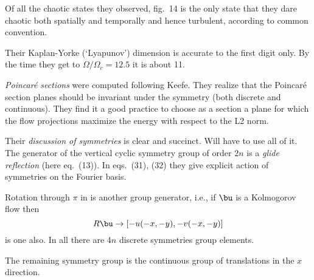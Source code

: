 \begin{description}
\begin{description}
{Of all the chaotic states they observed, fig.~14 is the only state that
they dare
chaotic both spatially and temporally and hence
turbulent, according to common convention.



Their Kaplan-Yorke (`Lyapunov') dimension is accurate to the first digit only.
By the time they get to $\Omega/\Omega_c=12.5$ it is about 11.

\emph{Poincar\'e sections} were computed following Keefe. They
realize that the Poincar\'e section planes should be invariant under the
symmetry (both discrete and continuous). They find it a good practice to
choose as a section a plane for which the flow projections maximize the
energy with respect to the L2 norm.

Their \emph{discussion of symmetries} is clear and succinct. Will have
to use all of it.
The generator
of the vertical cyclic symmetry group of order $2n$ is a \emph{glide reflection}
(here eq.~(13)). In eqs.~(31), (32)
they give explicit action of symmetries on the Fourier basis.

Rotation through $\pi$ in is another group
generator, i.e., if $\bu$ is a Kolmogorov flow then
\[
R \bu \to [-u(-x,-y),-v(-x,-y)]
\]
is one also. In all there are $4n$ discrete symmetries group elements.

The remaining symmetry group is the continuous group of translations
in the $x$ direction.

    }

\end{description}
\end{description}
